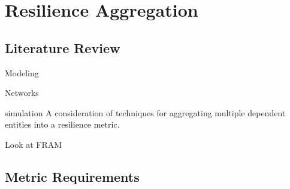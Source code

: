 
\renewcommand{\thechapter}{4}

\chapter{Resilience Aggregation}

\section{Literature Review}
Modeling

Networks

simulation
A consideration of techniques for aggregating multiple dependent
entities into a resilience metric.

Look at FRAM


\section{Metric Requirements}

